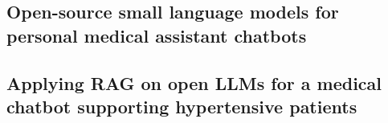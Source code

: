 \subsection{Open-source small language models for personal medical assistant chatbots}\label{subsec:open-source-small-language-models-for-personal-medical-assistant-chatbots}

\subsection{Applying \Gls{RAG} on open \Glspl{LLM} for a medical chatbot supporting hypertensive patients}\label{subsec:applying-rag-on-open-llm-for-a-medical-chatbot-supporting-hypertensive-patients}